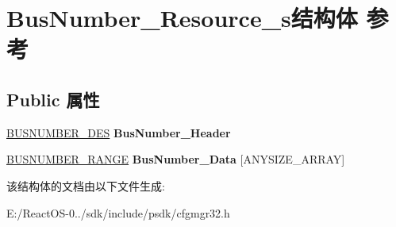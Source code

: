 \hypertarget{struct_bus_number___resource__s}{}\section{Bus\+Number\+\_\+\+Resource\+\_\+s结构体 参考}
\label{struct_bus_number___resource__s}
\subsection*{Public 属性}
\begin{DoxyCompactItemize}
\item 
\mbox{\label{struct_bus_number___resource__s_a1dc0d2c7cf1674ae3e1f50dd55e33550}} 
\hyperlink{struct_bus_number___des__s}{B\+U\+S\+N\+U\+M\+B\+E\+R\+\_\+\+D\+ES} {\bfseries Bus\+Number\+\_\+\+Header}
\item 
\mbox{\label{struct_bus_number___resource__s_a24b8fdde5e11cdafe7def35c463aa83b}} 
\hyperlink{struct_bus_number___range__s}{B\+U\+S\+N\+U\+M\+B\+E\+R\+\_\+\+R\+A\+N\+GE} {\bfseries Bus\+Number\+\_\+\+Data} \mbox{[}A\+N\+Y\+S\+I\+Z\+E\+\_\+\+A\+R\+R\+AY\mbox{]}
\end{DoxyCompactItemize}


该结构体的文档由以下文件生成\+:\begin{DoxyCompactItemize}
\item 
E\+:/\+React\+O\+S-\/0../sdk/include/psdk/cfgmgr32.\+h\end{DoxyCompactItemize}
